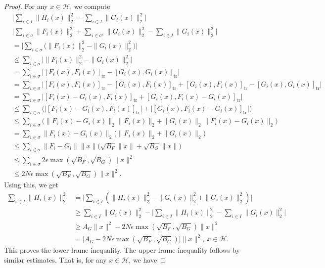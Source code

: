 \documentclass[reqno]{amsart}
\theoremstyle{plain}
\theoremstyle{remark}
\numberwithin{equation}{section}
\begin{document}
\begin{proof}
For any  $x \in \mathcal{H}$, we compute
\begin{align*}
&\Big| \sum_{i \in I} \|H_i(x)\|_2^2 - \sum_{i \in I} \|G_i(x)\|_2^2 \Big| \\
&\Big|  \sum_{i \in \sigma} \|F_i(x)\|_2^2 + \sum_{i \in \sigma^c} \|G_i(x)\|_2^2 - \sum_{i \in I} \|G_i(x)\|_2^2 \Big| \\
&= \Big| \sum_{i \in \sigma} \big( \|F_i(x)\|_2^2 - \|G_i(x)\|_2^2 \big) \Big|\\
& \leq   \sum_{i \in \sigma} \Big|  \|F_i(x)\|_2^2 - \|G_i(x)\|_2^2  \Big|\\
&=  \sum_{i \in \sigma} \Big| [F_i(x), F_i(x) ]_{\text{tr}}-[G_i(x), G_i(x) ]_{\text{tr}}\Big|\\
&=  \sum_{i \in \sigma} \Big| [F_i(x), F_i(x) ]_{\text{tr}}-[G_i(x), F_i(x) ]_{\text{tr}}+[G_i(x), F_i(x) ]_{\text{tr}}-[G_i(x), G_i(x) ]_{\text{tr}}\Big|\\
&=  \sum_{i \in \sigma} \Big| [F_i(x)-G_i(x), F_i(x) ]_{\text{tr}}+[G_i(x), F_i(x)-G_i(x)]_{\text{tr}}\Big|\\
&\leq  \sum_{i \in \sigma} \Big(\big| [F_i(x)-G_i(x), F_i(x) ]_{\text{tr}}\big|+\big|[G_i(x), F_i(x)-G_i(x)]_{\text{tr}}\big|\Big)\\
&\leq  \sum_{i \in \sigma} \Big(\| F_i(x)-G_i(x)\|_2 \|F_i(x) \|_2+\|G_i(x)\|_2 \|F_i(x)-G_i(x)\|_2\Big)\\
&=  \sum_{i \in \sigma} \| F_i(x)-G_i(x)\|_2 \big(\|F_i(x) \|_2+\|G_i(x)\|_2\big)\\
&\leq  \sum_{i \in \sigma} \|F_i - G_i\|\|x\| \big(\sqrt{B_F} \|x\|+\sqrt{B_G} \|x\|\big)\\
&\leq  \sum_{i \in \sigma} 2\epsilon  \max(\sqrt{B_F}, \sqrt{B_G}) \|x\|^2 \\
&\leq   2 N \epsilon  \max(\sqrt{B_F}, \sqrt{B_G}) \|x\|^2.
\end{align*}
Using this, we get
\begin{align*}
\sum_{i \in I} \|H_i(x)\|_2^2 &=\Big|\sum_{i \in I}( \|H_i(x)\|_2^2 - \|G_i(x)\|_2^2 + \|G_i(x)\|_2^2) \Big|\\
&\geq \sum_{i \in I} \|G_i(x)\|_2^2-\Big| \sum_{i \in I} \|H_i(x)\|_2^2 - \sum_{i \in I} \|G_i(x)\|_2^2 \Big|\\
&\geq A_G \|x\|^2- 2 N \epsilon \max(\sqrt{B_F}, \sqrt{B_G}) \|x\|^2\\
&=\big[A_G - 2 N \epsilon \max(\sqrt{B_F}, \sqrt{B_G}) \big] \|x\|^2, \ x \in \mathcal{H}.
\end{align*}
This proves the lower frame inequality. The upper frame inequality follows by similar estimates. That is, for any  $x \in \mathcal{H}$, we have

\end{proof}
\end{document}
